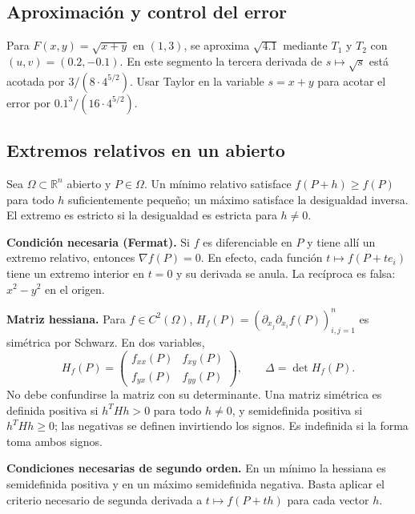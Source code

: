 \documentclass[12pt,a4paper]{article}
\begin{document}
\subsection*{Aproximación y control del error} Para $F(x,y)=\sqrt{x+y}$ en $(1,3)$, se aproxima $\sqrt{4.1}$ mediante $T_1$ y $T_2$ con $(u,v)=(0.2,-0.1)$. En este segmento la tercera derivada de $s\mapsto\sqrt{s}$ está acotada por $3/(8\cdot4^{5/2})$. Usar Taylor en la variable $s=x+y$ para acotar el error por $0.1^3/(16\cdot4^{5/2})$.
\subsection*{Extremos relativos en un abierto}
Sea $\Omega\subset\mathbb R^n$ abierto y $P\in\Omega$. Un mínimo relativo satisface $f(P+h)\ge f(P)$ para todo $h$ suficientemente pequeño; un máximo satisface la desigualdad inversa. El extremo es estricto si la desigualdad es estricta para $h\ne0$.

\textbf{Condición necesaria (Fermat).} Si $f$ es diferenciable en $P$ y tiene allí un extremo relativo, entonces $\boxed{\nabla f(P)=0}$. En efecto, cada función $t\mapsto f(P+te_i)$ tiene un extremo interior en $t=0$ y su derivada se anula. La recíproca es falsa: $x^2-y^2$ en el origen.

\textbf{Matriz hessiana.} Para $f\in C^2(\Omega)$, $H_f(P)=(\partial_{x_j}\partial_{x_i}f(P))_{i,j=1}^n$ es simétrica por Schwarz. En dos variables,
\[H_f(P)=\begin{pmatrix}f_{xx}(P)&f_{xy}(P)\\f_{yx}(P)&f_{yy}(P)\end{pmatrix},\qquad \Delta=\det H_f(P).\]
No debe confundirse la matriz con su determinante. Una matriz simétrica es definida positiva si $h^THh>0$ para todo $h\ne0$, y semidefinida positiva si $h^THh\ge0$; las negativas se definen invirtiendo los signos. Es indefinida si la forma toma ambos signos.

\textbf{Condiciones necesarias de segundo orden.} En un mínimo la hessiana es semidefinida positiva y en un máximo semidefinida negativa. Basta aplicar el criterio necesario de segunda derivada a $t\mapsto f(P+th)$ para cada vector $h$.
\end{document}
